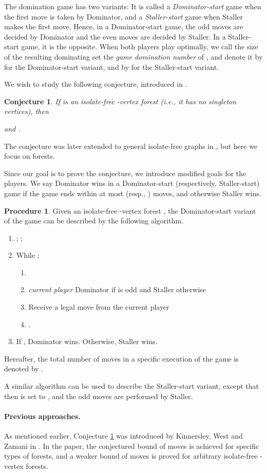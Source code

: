 \documentclass[11pt]{article}
\def\dnsitem{\vspace{-7pt}\item}
\def\dnssubitem{\vspace{-5pt}\item}
\newtheorem{conjecture}{Conjecture}
\theoremstyle{definition}
\newtheorem{procedure}[theorem]{Procedure}
\begin{document}
The domination game has two variants:
It is called a \emph{Dominator-start} game when the first move is taken by Dominator, 
and a \emph{Staller-start} game when Staller makes the first move.
Hence, in a Dominator-start game, the odd moves are decided by Dominator and the even moves are decided by Staller.
In a Staller-start game, it is the opposite.
When both players play optimally, we call the size of the resulting dominating set the \emph{game domination number} of , 
and denote it by  for the Dominator-start variant, and by  for the Staller-start variant.

We wish to study the following conjecture, introduced in \cite{kinnersley2013extremal}.
\begin{conjecture}
\label{conjecture:3_5}
If  is an isolate-free -vertex forest (i.e., it has no singleton vertices), then 
 
and 
.
\end{conjecture}
The conjecture was later extended to general isolate-free graphs in \cite{bujtas2015domination}, but here we focus on forests.

Since our goal is to prove the conjecture, we introduce modified goals for the players.
We say Dominator wins in a Dominator-start (respectively, Staller-start) game if the game ends within at most  (resp., ) moves, and otherwise Staller wins.

\begin{procedure}
\label{proc:game_outline}
Given an isolate-free -vertex forest , the Dominator-start variant of the game can be described by the following algorithm.
\begin{enumerate}
	\dnsitem ;
              ;
	      
	\dnsitem While :
	\begin{enumerate}
		\dnsitem 
		\dnssubitem \emph{current player}  Dominator if  is odd and Staller otherwise
		\dnssubitem Receive a legal move  from the current player
		\dnssubitem .
	\end{enumerate}
	\dnsitem If , Dominator wins. Otherwise, Staller wins.
\end{enumerate}
\end{procedure}

Hereafter, the total number of moves in a specific execution of the game is denoted by .

A similar algorithm can be used to describe the Staller-start variant, except that then  is set to , and the odd moves are performed by Staller.

\paragraph{Previous approaches.}
As mentioned earlier, Conjecture \ref{conjecture:3_5} was introduced by Kinnersley, West and Zamani in \cite{kinnersley2013extremal}.
In the paper, the conjectured bound of  moves is achieved for specific types of forests, and a weaker bound of  moves is proved for arbitrary isolate-free -vertex forests.
\end{document}
